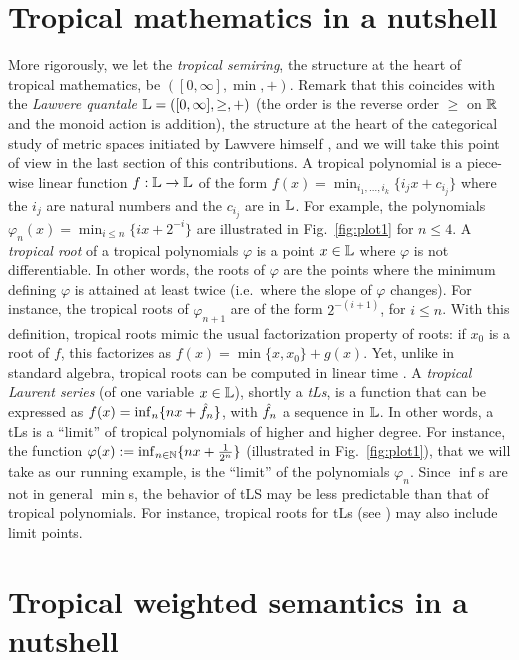 \documentclass[submission,%
]{eptcs}
\begin{document}
\section{Tropical mathematics in a nutshell}

More rigorously, we let the \emph{tropical semiring}, the structure at the heart of tropical mathematics, be $([0,\infty], \min, +)$.
Remark that this coincides with the \emph{Lawvere quantale} $\mathbb{L}=([0,\infty], \geq, +)$ \cite{Hofmann2014, Stubbe2014} (the order is the reverse order $\geq$ on $\mathbb{R}$ and the monoid action is addition), the structure at the heart of the categorical study of metric spaces initiated by Lawvere himself \cite{Lawvere1973}, and we will take this point of view in the last section of this contributions.
A tropical polynomial is a piece-wise linear function $f:\mathbb{L}\to \mathbb{L}$ of the form $f(x)=\min_{i_{1},\dots, i_{k}}\{i_{j}x+c_{i_{j}}\}$
where the $i_{j}$ are natural numbers and the $c_{i_{j}}$ are in $\mathbb{L}$.
For example, the polynomials $\varphi_{n}(x)=\min_{i\leq n}\{ix+2^{-i}\}$
are illustrated in Fig.~\ref{fig:plot1} for $n\leq 4$.
A \emph{tropical root} of a tropical polynomials $\varphi$ is a point $x\in \mathbb{L}$ where $\varphi$ is not differentiable. In other words, the roots of $\varphi$ are the points where the minimum defining $\varphi$ is attained at least twice (i.e.~where the slope of $\varphi$ changes). For instance, the tropical roots of $\varphi_{n+1}$ are of the form $2^{-(i+1)}$, for $i \leq n$.
With this definition, tropical roots mimic the usual factorization property of roots: if $x_{0}$ is a root of $f$, this factorizes as
$f(x)=\min\{x,x_{0}\}+ g(x)$. Yet, unlike in standard algebra, tropical roots can be computed in linear time \cite{Noferini2015}.
A \emph{tropical Laurent series} (of one variable $x\in\mathbb{L}$), shortly a \emph{tLs}, is a function that can be expressed as $f(x)=\inf_{n}\{nx+\hat{f}_{n}\}$, with $\hat{f}_{n}$ a sequence in $\mathbb{L}$. In other words, a tLs is a ``limit'' of tropical polynomials of higher and higher degree. For instance, the function $\varphi(x):=\inf_{n\in\mathbb{N}}\{nx+\frac{1}{2^n}\}$ (illustrated in Fig.~\ref{fig:plot1}), that we will take as our running example, 
is the ``limit'' of the polynomials $\varphi_{n}$. Since $\inf$s are not in general $\min$s, the behavior of tLS may be less predictable than that of tropical polynomials. For instance, tropical roots for tLs (see \cite{Porzio2021}) may also include limit points.

\section{Tropical weighted semantics in a nutshell}
\end{document}

